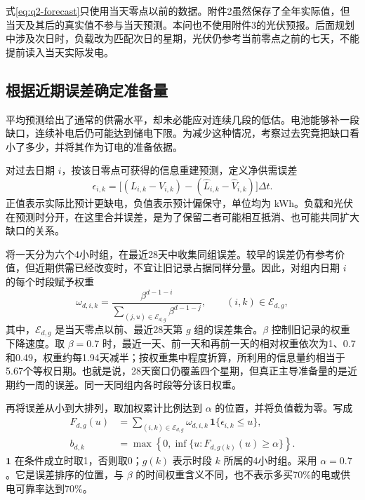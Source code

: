 式\eqref{eq:q2-forecast}只使用当天零点以前的数据。附件2虽然保存了全年实际值，但当天及其后的真实值不参与当天预测。本问也不使用附件3的光伏预报。后面规划中涉及次日时，负载改为匹配次日的星期，光伏仍参考当前零点之前的七天，不能提前读入当天实际发电。

\subsection{根据近期误差确定准备量}

平均预测给出了通常的供需水平，却未必能应对连续几段的低估。电池能够补一段缺口，连续补电后仍可能达到储电下限。为减少这种情况，考察过去究竟把缺口看小了多少，并将其作为订电的准备依据。

对过去日期 $i$，按该日零点可获得的信息重建预测，定义净供需误差
\begin{equation}
\epsilon_{i,k}=\big[(L_{i,k}-V_{i,k})-(\widehat L_{i,k}-\widehat V_{i,k})\big]\Delta t.
\label{eq:q2-error}
\end{equation}
正值表示实际比预计更缺电，负值表示预计偏保守，单位均为 kWh。负载和光伏在预测时分开，在这里合并误差，是为了保留二者可能相互抵消、也可能共同扩大缺口的关系。

将一天分为六个4小时组，在最近28天中收集同组误差。较早的误差仍有参考价值，但近期供需已经改变时，不宜让旧记录占据同样分量。因此，对组内日期 $i$ 的每个时段赋予权重
\begin{equation}
\omega_{d,i,k}=\frac{\beta^{d-1-i}}
{\displaystyle\sum_{(j,u)\in\mathcal E_{d,g}}\beta^{d-1-j}},\qquad (i,k)\in\mathcal E_{d,g},
\label{eq:q2-weight}
\end{equation}
其中，$\mathcal E_{d,g}$ 是当天零点以前、最近28天第 $g$ 组的误差集合。$\beta$ 控制旧记录的权重下降速度。取 $\beta=0.7$ 时，最近一天、前一天和再前一天的相对权重依次为1、0.7和0.49，权重约每1.94天减半；按权重集中程度折算，所利用的信息量约相当于5.67个等权日期。也就是说，28天窗口仍覆盖四个星期，但真正主导准备量的是近期约一周的误差。同一天同组内各时段等分该日权重。

再将误差从小到大排列，取加权累计比例达到 $\alpha$ 的位置，并将负值截为零。写成
\begin{align}
F_{d,g}(u)&=\sum_{(i,k)\in\mathcal E_{d,g}}\omega_{d,i,k}\,\mathbf{1}\{\epsilon_{i,k}\le u\},\\
b_{d,k}&=\max\left\{0,\inf\{u:F_{d,g(k)}(u)\ge\alpha\}\right\}.
\label{eq:q2-margin}
\end{align}
$\mathbf1$ 在条件成立时取1，否则取0；$g(k)$ 表示时段 $k$ 所属的4小时组。采用 $\alpha=0.7$。它是误差排序的位置，与 $\beta$ 的时间权重含义不同，也不表示多买70\%的电或供电可靠率达到70\%。

